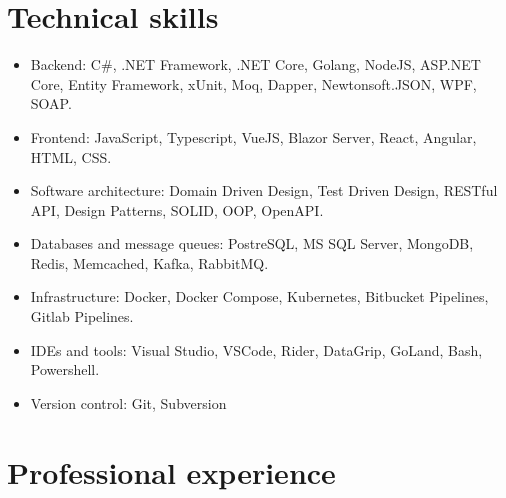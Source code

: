 \documentclass{article}
\begin{document}
\section*{Technical skills}

\begin{itemize}
    \item {
        Backend: C\#, .NET Framework, .NET Core, Golang, NodeJS, ASP.NET Core, Entity Framework, xUnit, Moq, Dapper, Newtonsoft.JSON, WPF, SOAP.
    }
    \item {
        Frontend: JavaScript, Typescript, VueJS, Blazor Server, React, Angular, HTML, CSS.
    }
    \item {
        Software architecture: Domain Driven Design, Test Driven Design, RESTful API, Design Patterns, SOLID, OOP, OpenAPI.
    }
    \item {
        Databases and message queues: PostreSQL, MS SQL Server, MongoDB, Redis, Memcached, Kafka, RabbitMQ.
    }
    \item {
        Infrastructure: Docker, Docker Compose, Kubernetes, Bitbucket Pipelines, Gitlab Pipelines.
    }
    \item {
        IDEs and tools: Visual Studio, VSCode, Rider, DataGrip, GoLand, Bash, Powershell.
    }
    \item {
        Version control: Git, Subversion
    }
\end{itemize}

\section*{Professional experience}
\end{document}
